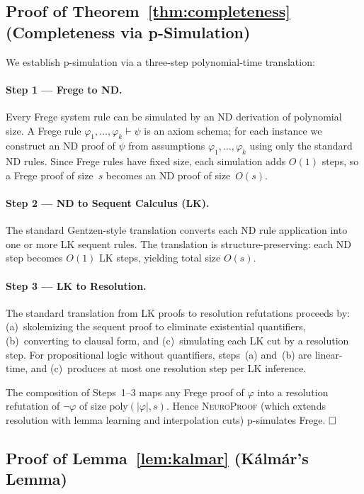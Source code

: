 \documentclass[conference]{IEEEtran}
\newcommand{\NP}{\textsc{NeuroProof}}
\newcommand{\poly}{\mathrm{poly}}
\begin{document}
\subsection{Proof of Theorem~\ref{thm:completeness}
  (Completeness via p-Simulation)}

We establish p-simulation via a three-step polynomial-time translation:

\paragraph{Step 1 --- Frege to ND.}
Every Frege system rule can be simulated by an ND derivation of
polynomial size.  A Frege rule
$\varphi_1, \ldots, \varphi_k \vdash \psi$ is an axiom schema; for each
instance we construct an ND proof of $\psi$ from assumptions
$\varphi_1, \ldots, \varphi_k$ using only the standard ND rules.
Since Frege rules have fixed size, each simulation adds $O(1)$ steps,
so a Frege proof of size~$s$ becomes an ND proof of size~$O(s)$.

\paragraph{Step 2 --- ND to Sequent Calculus (LK).}
The standard Gentzen-style translation converts each ND rule application
into one or more LK sequent rules.  The translation is structure-preserving:
each ND step becomes $O(1)$ LK steps, yielding total size $O(s)$.

\paragraph{Step 3 --- LK to Resolution.}
The standard translation from LK proofs to resolution refutations
proceeds by: (a)~skolemizing the sequent proof to eliminate
existential quantifiers, (b)~converting to clausal form, and
(c)~simulating each LK cut by a resolution step.  For propositional
logic without quantifiers, steps~(a) and~(b) are linear-time, and
(c)~produces at most one resolution step per LK inference.

The composition of Steps~1--3 maps any Frege proof of $\varphi$ into
a resolution refutation of $\neg\varphi$ of size $\poly(|\varphi|, s)$.
Hence \NP{} (which extends resolution with lemma learning and
interpolation cuts) p-simulates Frege.  $\hfill\square$

\subsection{Proof of Lemma~\ref{lem:kalmar} (K\'{a}lm\'{a}r's Lemma)}
\end{document}

